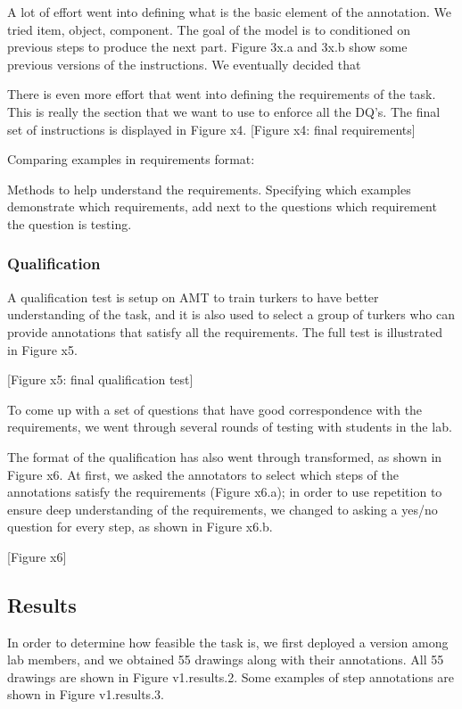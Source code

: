 A lot of effort went into defining what is the basic element of the annotation. We tried item, object, component. The goal of the model is to conditioned on previous steps to produce the next part. Figure 3x.a and 3x.b show some previous versions of the instructions. We eventually decided that  

There is even more effort that went into defining the requirements of the task. This is really the section that we want to use to enforce all the DQ's. The final set of instructions is displayed in Figure x4.
[Figure x4: final requirements]

Comparing examples in requirements format:

Methods to help understand the requirements. 
Specifying which examples demonstrate which requirements, add next to the questions which requirement the question is testing. 



\subsubsection{Qualification}

A qualification test is setup on AMT to train turkers to have better understanding of the task, and it is also used to select a group of turkers who can provide annotations that satisfy all the requirements. The full test is illustrated in Figure x5.

[Figure x5: final qualification test]

To come up with a set of questions that have good correspondence with the requirements, we went through several rounds of testing with students in the lab.  

The format of the qualification has also went through transformed, as shown in Figure x6. At first, we asked the annotators to select which steps of the annotations satisfy the requirements (Figure x6.a); in order to use repetition to ensure deep understanding of the requirements, we changed to asking a yes/no question for every step, as shown in Figure x6.b.  

[Figure x6]

\subsection{Results}

In order to determine how feasible the task is, we first deployed a version among lab members, and we obtained 55 drawings along with their annotations. All 55 drawings are shown in Figure v1.results.2. Some examples of step annotations are shown in Figure v1.results.3.  

